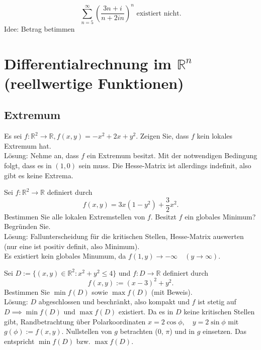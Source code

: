 \documentclass[parskip=full]{scrartcl}
\begin{document}
\begin{displaymath}
  \sum_{n = 5}^{\infty} \left(\frac{3n+i}{n + 2in}\right)^n \text{ existiert nicht.}
\end{displaymath}
Idee: Betrag betimmen

\section{Differentialrechnung im $\mathbb{R}^n$ (reellwertige Funktionen)}
\subsection{Extremum}
Es sei $f : \mathbb{R}^2 \to \mathbb{R}, f(x,y) = -x^2 + 2x + y^2$.
Zeigen Sie, dass $f$ kein lokales Extremum hat.\\
Lösung:
Nehme an, dass $f$ ein Extremum besitzt.
Mit der notwendigen Bedingung folgt, dass es in $(1,0)$ sein muss.
Die Hesse-Matrix ist allerdings indefinit, also gibt es keine Extrema.

Sei $f : \mathbb{R}^2 \to \mathbb{R}$ definiert durch
\begin{displaymath}
  f(x,y) = 3x(1 - y^2) + \frac{3}{2}x^2.
\end{displaymath}
Bestimmen Sie alle lokalen Extremstellen von $f$.
Besitzt $f$ ein globales Minimum?
Begründen Sie.\\
Lösung:
Fallunterscheidung für die kritischen Stellen, Hesse-Matrix auswerten (nur eine ist positiv definit, also Minimum).\\
Es existiert kein globales Minumum, da $f(1,y) \to -\infty \quad (y \to \infty)$.

Sei $D := \{(x,y) \in \mathbb{R}^2 : x^2 + y^2 \leq 4\}$ und $f : D \to \mathbb{R}$ definiert durch
\begin{displaymath}
  f(x,y) := (x - 3)^2 + y^2.
\end{displaymath}
Bestimmen Sie $\min f(D)$ sowie $\max f(D)$ (mit Beweis).\\
Lösung:
$D$ abgeschlossen und beschränkt, also kompakt und $f$ ist stetig auf $D \implies \min f(D)$ und $\max f(D)$ existiert.
Da es in $D$ keine kritischen Stellen gibt, Randbetrachtung über Polarkoordinaten $x = 2 \cos \phi, \quad y = 2 \sin \phi$ mit $g(\phi) := f(x,y)$.
Nullstellen von $g$ betrachten ($0$, $\pi$) und in $g$ einsetzen.
Das entspricht $\min f(D)$ bzw. $\max f(D)$.
\end{document}
